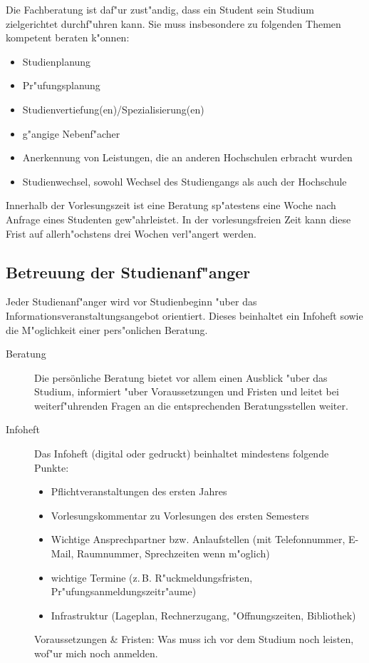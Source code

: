 Die Fachberatung ist daf"ur zust"andig, dass ein Student sein Studium
zielgerichtet durchf"uhren kann. Sie muss insbesondere zu folgenden
Themen kompetent beraten k"onnen:
\begin{itemize}
	\item Studienplanung
	\item Pr"ufungsplanung
	\item Studienvertiefung(en)/Spezialisierung(en)
	\item g"angige Nebenf"acher
	\item Anerkennung von Leistungen, die an anderen Hochschulen erbracht wurden
	\item Studienwechsel, sowohl Wechsel des Studiengangs als auch der Hochschule
\end{itemize}

Innerhalb der Vorlesungszeit ist eine Beratung sp"atestens eine Woche nach
Anfrage eines Studenten gew"ahrleistet. In der vorlesungsfreien Zeit
kann diese Frist auf allerh"ochstens drei Wochen verl"angert werden.

\subsection{Betreuung der Studienanf"anger}

Jeder Studienanf"anger wird vor Studienbeginn "uber das Informationsveranstaltungsangebot orientiert.
Dieses beinhaltet ein Infoheft sowie die M"oglichkeit einer pers"onlichen Beratung.

\begin{description}
	\item [Beratung] Die persönliche Beratung bietet vor allem einen Ausblick "uber das Studium, informiert "uber Voraussetzungen und Fristen und leitet bei weiterf"uhrenden Fragen an die entsprechenden Beratungsstellen weiter.

	\item [Infoheft] Das Infoheft (digital oder gedruckt) beinhaltet mindestens folgende Punkte:
	\begin{itemize}
		\item Pflichtveranstaltungen des ersten Jahres 
		\item Vorlesungskommentar zu Vorlesungen des ersten Semesters
		\item Wichtige Ansprechpartner bzw. Anlaufstellen (mit Telefonnummer,
			E-Mail, Raumnummer, Sprechzeiten wenn m"oglich)
		\item wichtige Termine (z.\,B. R"uckmeldungsfristen, Pr"ufungsanmeldungszeitr"aume)
		\item Infrastruktur (Lageplan, Rechnerzugang, "Offnungszeiten, Bibliothek)
	\end{itemize}

	\begin{kcmt}\begin{komacmt}
	Voraussetzungen \& Fristen: Was muss ich vor dem Studium noch leisten,
	wof"ur mich noch anmelden.
	\end{komacmt}\end{kcmt}
\end{description}

